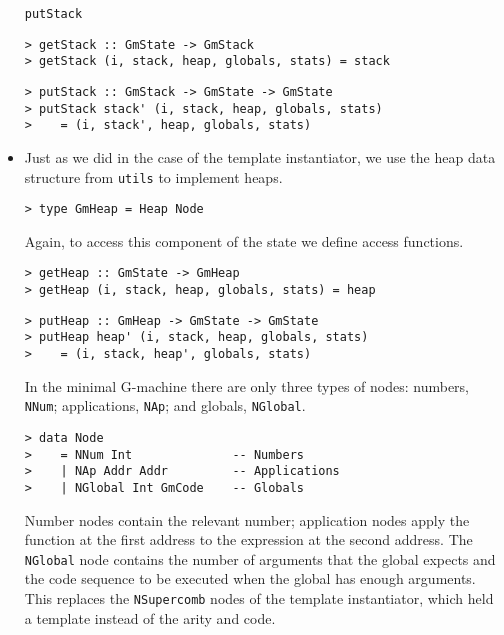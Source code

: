 \begin{itemize}
\mbox{\tt putStack}
\begin{verbatim}
> getStack :: GmState -> GmStack
> getStack (i, stack, heap, globals, stats) = stack
\end{verbatim}
%
%
\begin{verbatim}
> putStack :: GmStack -> GmState -> GmState
> putStack stack' (i, stack, heap, globals, stats)
>    = (i, stack', heap, globals, stats)
\end{verbatim}
%
%
\item Just as we did in the case of the template instantiator, we use
the heap data structure from \mbox{\tt utils} to implement heaps.
\begin{verbatim}
> type GmHeap = Heap Node
\end{verbatim}
%
Again, to access this component of the state we define access
functions.
\begin{verbatim}
> getHeap :: GmState -> GmHeap
> getHeap (i, stack, heap, globals, stats) = heap
\end{verbatim}
%
%
\begin{verbatim}
> putHeap :: GmHeap -> GmState -> GmState
> putHeap heap' (i, stack, heap, globals, stats)
>    = (i, stack, heap', globals, stats)
\end{verbatim}
%
%
In the minimal G-machine there are only three types of nodes: numbers,
\mbox{\tt NNum}; applications, \mbox{\tt NAp}; and globals, \mbox{\tt NGlobal}.
\begin{verbatim}
> data Node 
>    = NNum Int              -- Numbers
>    | NAp Addr Addr         -- Applications
>    | NGlobal Int GmCode    -- Globals
\end{verbatim}
%
%
%
Number nodes contain the relevant number; application nodes apply the
function at the first address to the expression at the second address.
The \mbox{\tt NGlobal} node contains the number of arguments that the global
expects and the code sequence to be executed when the global has
enough arguments. This replaces the \mbox{\tt NSupercomb} nodes of the template
instantiator, which held a template instead of the arity and code.


\end{itemize}
